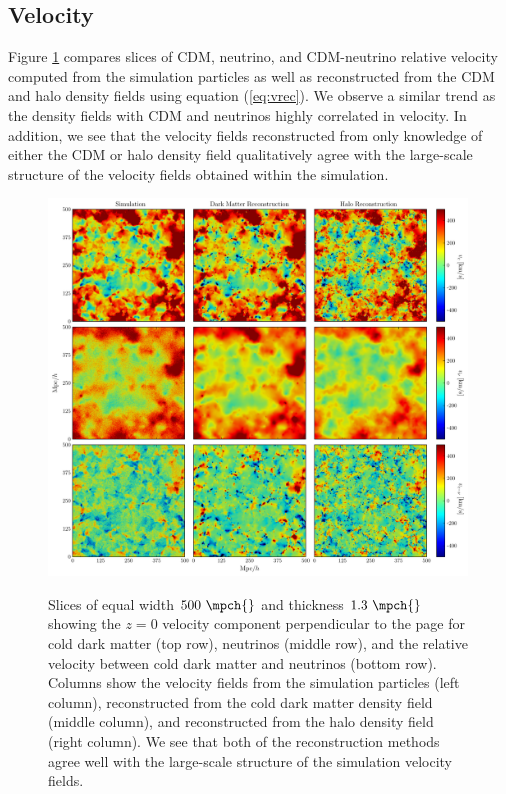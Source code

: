 \subsection{Velocity}

Figure \ref{fig:velslice} compares slices of CDM, neutrino, and CDM-neutrino relative velocity computed from the simulation particles as well as reconstructed from the CDM and halo density fields using equation (\ref{eq:vrec}). We observe a similar trend as the density fields with CDM and neutrinos highly correlated in velocity. In addition, we see that the velocity fields reconstructed from only knowledge of either the CDM or halo density field qualitatively agree with the large-scale structure of the velocity fields obtained within the simulation.

\begin{figure}
\begin{center}
\includegraphics[width=0.99\textwidth]{./figures/neutrinos/fig5.pdf} \vspace{-0.1cm}
\caption[Slices of simulated and reconstructed velocity fields]
{Slices of equal width $500\ \mpch{}$ and thickness
$1.3\ \mpch{}$ showing the $z = 0$ velocity component
perpendicular to the page for cold dark matter (top row),
neutrinos (middle row), and the relative velocity between
cold dark matter and neutrinos (bottom row). Columns show
the velocity fields from the simulation particles (left
column), reconstructed from the cold dark matter density
field (middle column), and reconstructed from the halo
density field (right column). We see that both of the
reconstruction methods agree well with the large-scale
structure of the simulation velocity fields.}
\vspace{-0.5cm}
\label{fig:velslice}
\end{center}
\end{figure}

